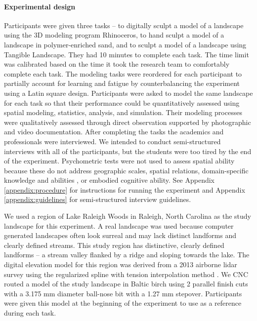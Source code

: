 \documentclass[prodmode,acmtochi]{acmsmall} %
\begin{document}
\paragraph{Experimental design}
Participants were given three tasks -- 
to digitally sculpt a model of a landscape using the 3D modeling program Rhinoceros, 
to hand sculpt a model of a landscape in polymer-enriched sand,
and to sculpt a model of a landscape using Tangible Landscape.
They had 10 minutes to complete each task. 
The time limit was calibrated based on 
the time it took the research team 
to comfortably complete each task. 
The modeling tasks were reordered for each participant
to partially account for learning and fatigue
by counterbalancing the experiment using a Latin square design.
Participants were asked to model the same landscape for each task 
so that their performance could be quantitatively assessed 
using spatial modeling, statistics, analysis, and simulation.
Their modeling processes were qualitatively assessed 
through direct observation
supported by photographic and video documentation. 
% 
After completing the tasks
the academics and professionals 
were interviewed. 
We intended to conduct semi-structured interviews 
with all of the participants, but
the students were too tired by the end of the experiment. 
%
Psychometric tests were not used
to assess spatial ability because
these do not address 
geographic scales,
spatial relations,
domain-specific knowledge and abilities 
\cite{Lee2009,Bednarz2011,Wakabayashi2011},
or embodied cognitive ability. 
%
See Appendix 
\ref{appendix:procedure} for instructions for running the experiment
and Appendix 
\ref{appendix:guidelines} for semi-structured interview guidelines. 

We used a region of Lake Raleigh Woods in Raleigh, North Carolina 
as the study landscape for this experiment. 
A real landscape was used because computer generated landscapes 
often look surreal and may lack distinct landforms and clearly defined streams. 
This study region has distinctive, 
clearly defined landforms -- a stream valley flanked by a ridge and sloping towards the lake.
The digital elevation model for this region was derived from a 2013 airborne lidar survey 
using the regularized spline with tension interpolation method \cite{Mitasova2005}. 
We CNC routed a model of the study landscape in Baltic birch 
using 2 parallel finish cuts 
with a 3.175 mm diameter ball-nose bit
with a 1.27 mm stepover. 
Participants were given this model 
at the beginning of the experiment
to use as a reference during each task.
\end{document}
